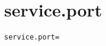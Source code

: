 \section{service.port}
\label{configuration:ServicePort}
\ClearAPI
\TODO
{}
\begin{lstlisting}[style=Props,caption={Usage example for \textit{service.port}}]
service.port=
\end{lstlisting}